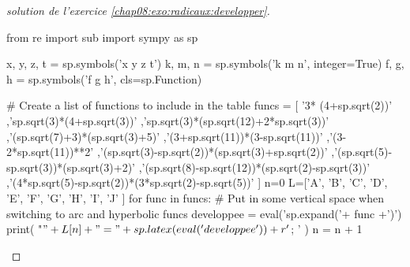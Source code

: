 \documentclass[main.tex]{subfiles}
\begin{document}
% 
\begin{proof}[solution de l'exercice \ref{chap08:exo:radicaux:developper}] 
	\begin{pycode}
from re import sub
import sympy as sp

x, y, z, t = sp.symbols('x y z t')
k, m, n = sp.symbols('k m n', integer=True)
f, g, h = sp.symbols('f g h', cls=sp.Function)

# Create a list of functions to include in the table
funcs = [  '3* (4+sp.sqrt(2))'
,'sp.sqrt(3)*(4+sp.sqrt(3))'
,'sp.sqrt(3)*(sp.sqrt(12)+2*sp.sqrt(3))'
,'(sp.sqrt(7)+3)*(sp.sqrt(3)+5)'
,'(3+sp.sqrt(11))*(3-sp.sqrt(11))'  
,'(3-2*sp.sqrt(11))**2'  
,'(sp.sqrt(3)-sp.sqrt(2))*(sp.sqrt(3)+sp.sqrt(2))'
,'(sp.sqrt(5)-sp.sqrt(3))*(sp.sqrt(3)+2)'
,'(sp.sqrt(8)-sp.sqrt(12))*(sp.sqrt(2)-sp.sqrt(3))'
,'(4*sp.sqrt(5)-sp.sqrt(2))*(3*sp.sqrt(2)-sp.sqrt(5))'
]
n=0
L=['A', 'B', 'C', 'D', 'E', 'F', 'G', 'H', 'I', 'J'  ]
for func in funcs:
	# Put in some vertical space when switching to arc and hyperbolic funcs
	developpee =  eval('sp.expand('+ func +')')
	print( "$"+L[n] + "  =" + sp.latex( eval('developpee') )  + r'$; ' )
	n     = n + 1
\end{pycode}
\end{proof} 
\end{document}
